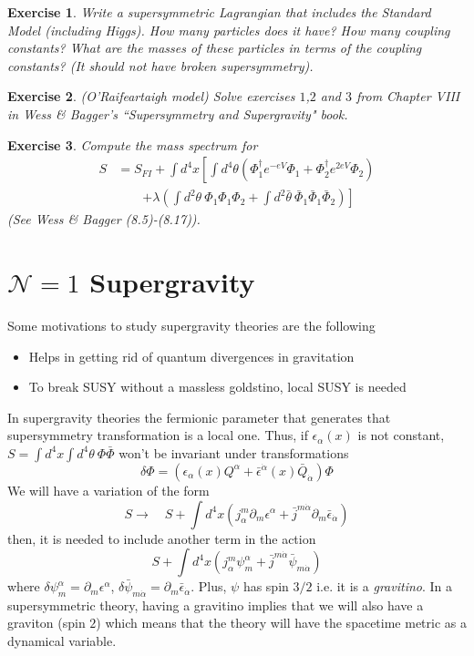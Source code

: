 \documentclass[a4paper,12pt]{article}
\newtheorem{exe}{Exercise}
\numberwithin{equation}{section}
\numberwithin{exe}{section}
\renewcommand{\dag}{{\dagger}}
\newcommand{\p}{{\partial}}
\newcommand{\Qb}{{\bar Q}}
\renewcommand{\a}{{\alpha}}
\newcommand{\ad}{{\dot\alpha}}
\renewcommand{\d}{{\delta}}
\newcommand{\e}{{\epsilon}}
\newcommand{\eb}{{\bar\epsilon}}
\renewcommand{\l}{{\lambda}}
\renewcommand{\t}{{\theta}}
\newcommand{\tb}{{\bar\theta}}
\newcommand{\Phib}{{\bar \Phi}}
\newcommand{\psib}{{\bar\psi}}
\begin{document}
	\begin{exe}
	Write a supersymmetric Lagrangian that includes the Standard Model (including Higgs). How many particles does it have? How many coupling constants? What are the masses of these particles in terms of the coupling constants? (It should not have broken supersymmetry).
	\end{exe}

	\begin{exe}
	(O'Raifeartaigh model) Solve exercises $1$,$2$ and $3$ from Chapter VIII in Wess \& Bagger's ``Supersymmetry and Supergravity" book.
	\end{exe}


	\begin{exe}
	Compute the mass spectrum for
		\begin{align}
		S & = S_{FI} + \int d^4 x \left[ \int d^4\t \left(\Phi^\dag_1 e^{-eV} \Phi_1 + \Phi^\dag_2 e^{2eV} \Phi_2\right)\right. \nonumber \\
		& \qquad \left. + \l\left(\int d^2\t\ \Phi_1\Phi_1\Phi_2 + \int d^2\tb\ \Phib_1\Phib_1\Phib_2\right)\right]
		\end{align}
	(See Wess \& Bagger (8.5)-(8.17)).
	\end{exe}


\newpage

\section{$\mathcal N=1$ Supergravity}
Some motivations to study supergravity theories are the following
	\begin{itemize}
	\item Helps in getting rid of quantum divergences in gravitation
	\item To break SUSY without a massless goldstino, local SUSY is needed
	\end{itemize}

In supergravity theories the fermionic parameter that generates that supersymmetry transformation is a local one. Thus, if $\e_\a(x)$ is not constant, $S= \int d^4x\int d^4\t\ \Phi\Phib$ won't be invariant under transformations
	\begin{equation}
	\d \Phi = (\e_\a(x) Q^\a + \eb^\ad(x) \Qb_\ad )\Phi
	\end{equation}
We will have a variation of the form
	\begin{equation}
	S \rightarrow\quad S + \int d^4x \left( j^m_\a \p_m \e^\a + \bar j^{m\ad} \p_m\eb_\ad \right)
	\end{equation}
then, it is needed to include another term in the action
	\begin{equation}
	S + \int d^4x \left( j^m_\a \psi^\a_m + \bar j^{m\ad} \psib_{m\ad} \right)
	\end{equation}
where $\d\psi^\a_m = \p_m\e^\a$, $\d\psib_{m\ad} = \p_m \eb_\ad$. Plus, $\psi$ has spin $3/2$ i.e. it is a {\it gravitino}. In a supersymmetric theory, having a gravitino implies that we will also have a graviton (spin $2$) which means that the theory will have the spacetime metric as a dynamical variable.
\end{document}
